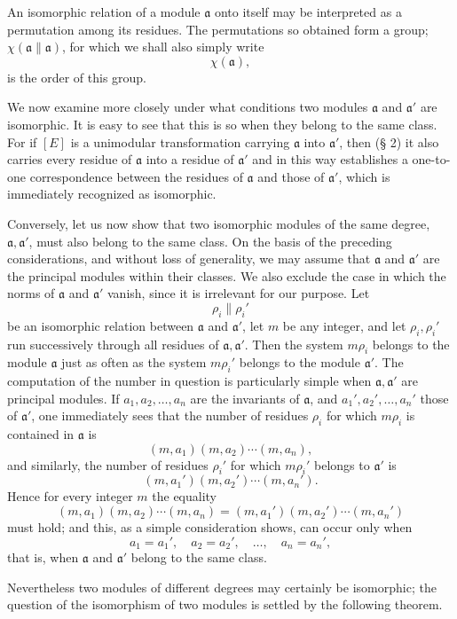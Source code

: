 An isomorphic relation of a module $\mathfrak a$ onto itself may be interpreted as a permutation among its residues. The permutations so obtained form a group; $\chi(\mathfrak a\parallel\mathfrak a)$, for which we shall also simply write
\[
 \chi(\mathfrak a),
\]
is the order of this group.

We now examine more closely under what conditions two modules $\mathfrak a$ and $\mathfrak a'$ are isomorphic. It is easy to see that this is so when they belong to the same class. For if $[E]$ is a unimodular transformation carrying $\mathfrak a$ into $\mathfrak a'$, then (§ 2) it also carries every residue of $\mathfrak a$ into a residue of $\mathfrak a'$ and in this way establishes a one-to-one correspondence between the residues of $\mathfrak a$ and those of $\mathfrak a'$, which is immediately recognized as isomorphic.

Conversely, let us now show that two isomorphic modules of the same degree, $\mathfrak a,\mathfrak a'$, must also belong to the same class. On the basis of the preceding considerations, and without loss of generality, we may assume that $\mathfrak a$ and $\mathfrak a'$ are the principal modules within their classes. We also exclude the case in which the norms of $\mathfrak a$ and $\mathfrak a'$ vanish, since it is irrelevant for our purpose. Let
\[
 \rho_i\parallel \rho_i'
\]
be an isomorphic relation between $\mathfrak a$ and $\mathfrak a'$, let $m$ be any integer, and let $\rho_i,\rho_i'$ run successively through all residues of $\mathfrak a,\mathfrak a'$. Then the system $m\rho_i$ belongs to the module $\mathfrak a$ just as often as the system $m\rho_i'$ belongs to the module $\mathfrak a'$. The computation of the number in question is particularly simple when $\mathfrak a,\mathfrak a'$ are principal modules. If $a_1,a_2,\ldots,a_n$ are the invariants of $\mathfrak a$, and $a_1',a_2',\ldots,a_n'$ those of $\mathfrak a'$, one immediately sees that the number of residues $\rho_i$ for which $m\rho_i$ is contained in $\mathfrak a$ is
\[
 (m,a_1)(m,a_2)\cdots(m,a_n),
\]
and similarly, the number of residues $\rho_i'$ for which $m\rho_i'$ belongs to $\mathfrak a'$ is
\[
 (m,a_1')(m,a_2')\cdots(m,a_n').
\]
Hence for every integer $m$ the equality
\[
 (m,a_1)(m,a_2)\cdots(m,a_n)=(m,a_1')(m,a_2')\cdots(m,a_n')
\]
must hold; and this, as a simple consideration shows, can occur only when
\[
 a_1=a_1',\quad a_2=a_2',\quad\ldots,\quad a_n=a_n',
\]
that is, when $\mathfrak a$ and $\mathfrak a'$ belong to the same class.

Nevertheless two modules of different degrees may certainly be isomorphic; the question of the isomorphism of two modules is settled by the following theorem.

